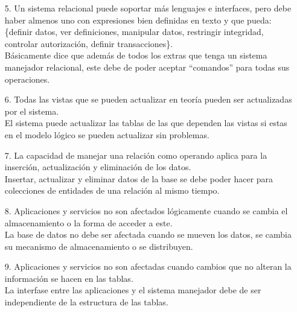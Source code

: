 \documentclass[12pt,a4paper]{article}
\begin{document}
\begin{enumerate}
\begin{enumerate}
\begin{enumerate}
					\item[5.] Un sistema relacional puede soportar más lenguajes e interfaces, pero
						debe haber almenos uno con expresiones bien definidas en texto y que pueda:
						\{definir datos, ver definiciones, manipular datos, restringir integridad,
						controlar autorización, definir transacciones\}.\\

						Básicamente dice que además de todos los extras que tenga un sistema
						manejador relacional, este debe de poder aceptar ``comandos''
						para todas sus operaciones.\\

						\pagebreak
					\item[6.] Todas las vistas que se pueden actualizar en teoría pueden
						ser actualizadas por el sistema.\\

						El sistema puede actualizar las tablas de las que dependen
						las vistas si estas en el modelo lógico se pueden actualizar
						sin problemas.\\

					\item[7.] La capacidad de manejar una relación como operando aplica para
						la inserción, actualización y eliminación de los datos.\\

						Insertar, actualizar y eliminar datos de la base se debe poder
						hacer para colecciones de entidades de una relación al mismo tiempo.\\

					\item[8.] Aplicaciones y servicios no son afectados lógicamente cuando
						se cambia el almacenamiento o la forma de acceder a este.\\

						La base de datos no debe ser afectada cuando se mueven los datos,
						se cambia su mecanismo de almacenamiento o se distribuyen.\\

					\item[9.] Aplicaciones y servicios no son afectadas cuando cambios
						que no alteran la información se hacen en las tablas.\\

						La interfase entre las aplicaciones y el sistema manejador
						debe de ser independiente de la estructura de las tablas.\\


\end{enumerate}
\end{enumerate}
\end{enumerate}
\end{document}
